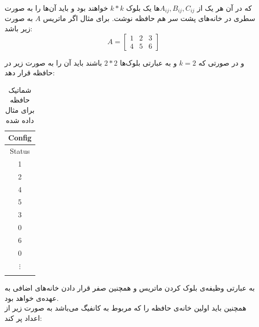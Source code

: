 \documentclass[12pt,onecolumn,a4paper,fleqn]{article}
\begin{document}
\pagebreak

که در آن هر یک از $A_{ij} , B_{ij} , C_{ij}$ها یک بلوک $k*k$ خواهند بود و باید آن‌ها را به صورت سطری در خانه‌های پشت سر هم حافظه نوشت. برای مثال اگر ماتریس $A$ به صورت زیر باشد:
$$ A = \begin{bmatrix}
1& 2 & 3\\
4& 5 & 6
\end{bmatrix} $$

و در صورتی که 
$k=2$
و به عبارتی بلوک‌ها $2*2$ باشند  باید آن را به صورت زیر در حافظه قرار دهد:

\begin{table}[h]
	\centering
	\begin{tabular}{clll}
		\hline
		\multicolumn{4}{|c|}{Config}                                          \\ \hline
		\multicolumn{4}{|c|}{Status}                                          \\ \hline
		\multicolumn{4}{|c|}{1}                                        \\ \hline
		\multicolumn{4}{|c|}{2}                                        \\ \hline
		\multicolumn{4}{|c|}{4}                                        \\ \hline
		\multicolumn{4}{|c|}{5}                                        \\ \hline
		
		\multicolumn{4}{|c|}{3}                                        \\ \hline
				\multicolumn{4}{|c|}{0}                                        \\ \hline
					\multicolumn{4}{|c|}{6}                                        \\ \hline
										\multicolumn{4}{|c|}{0}                                        \\ \hline
				\multicolumn{4}{|c|}{$\vdots$}                                        \\ \hline
		\multicolumn{4}{|l|}{\cellcolor[HTML]{595959}{\color[HTML]{595959}aaaaaaaaaaaaaaaaaaaaa }} \\ \hline   
	\end{tabular}
 	\caption{شماتیک حافظه برای مثال داده‌ شده}
\end{table}

به عبارتی وظیفه‌ی بلوک کردن ماتریس و همچنین صفر قرار دادن خانه‌های اضافی به عهده‌ی  خواهد بود. \\ 
همچنین  باید اولین خانه‌ی حافظه را که مربوط به کانفیگ می‌باشد به صورت زیر از اعداد پر کند:
\end{document}
